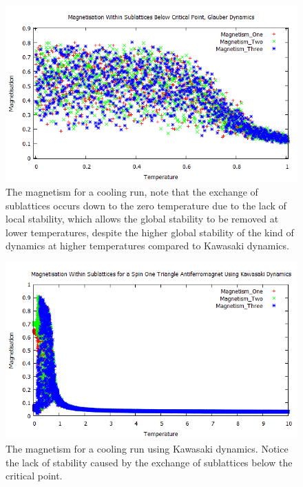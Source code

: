 \documentclass[]{article}
\begin{document}
\begin{figure}
\begin{center}
\includegraphics[scale=0.75]{Mag_G_BCP}
\caption{The magnetism for a cooling run, note that the exchange of sublattices occurs down to the zero temperature due to the lack of local stability, which allows the global stability to be removed at lower temperatures, despite the higher global stability of the kind of dynamics at higher temperatures compared to Kawasaki dynamics.}
\label{Mag_G_BCP}
\end{center}
\end{figure}

\begin{figure}
\begin{center}
\includegraphics[scale=0.75]{Mag_K}
\caption{The magnetism for a cooling run using Kawasaki dynamics. Notice the lack of stability caused by the exchange of sublattices below the critical point.}
\label{Mag_K}
\end{center}
\end{figure}
\end{document}

